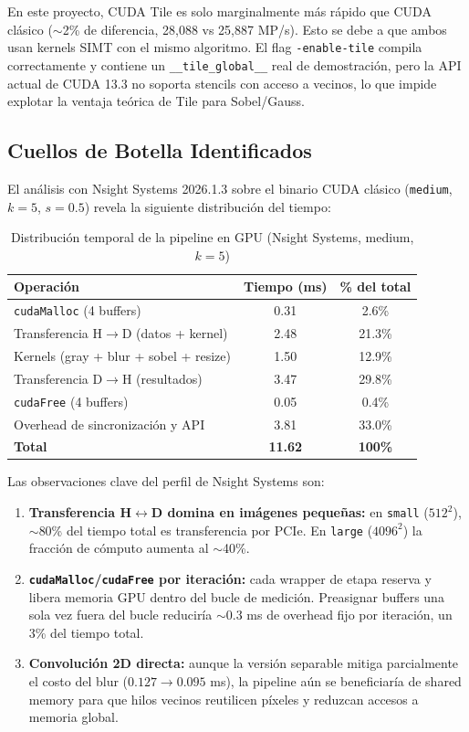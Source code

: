 \documentclass[12pt,a4paper]{article}
\begin{document}
En este proyecto, CUDA Tile es solo marginalmente m\'as r\'apido que CUDA cl\'asico ($\sim$2\% de diferencia, 28,088 vs 25,887 MP/s). Esto se debe a que ambos usan kernels SIMT con el mismo algoritmo. El flag \texttt{-enable-tile} compila correctamente y contiene un \texttt{\_\_tile\_global\_\_} real de demostraci\'on, pero la API actual de CUDA 13.3 no soporta stencils con acceso a vecinos, lo que impide explotar la ventaja te\'orica de Tile para Sobel/Gauss.

\subsection{Cuellos de Botella Identificados}

El an\'alisis con Nsight Systems 2026.1.3 sobre el binario CUDA cl\'asico (\texttt{medium}, $k=5$, $s=0.5$) revela la siguiente distribuci\'on del tiempo:

\begin{table}[H]
\centering
\caption{Distribuci\'on temporal de la pipeline en GPU (Nsight Systems, medium, $k=5$)}
\begin{tabular}{lcc}
\toprule
\textbf{Operaci\'on} & \textbf{Tiempo (ms)} & \textbf{\% del total} \\
\midrule
\texttt{cudaMalloc} (4 buffers) & 0.31 & 2.6\% \\
Transferencia H$\rightarrow$D (datos + kernel) & 2.48 & 21.3\% \\
Kernels (gray + blur + sobel + resize) & 1.50 & 12.9\% \\
Transferencia D$\rightarrow$H (resultados) & 3.47 & 29.8\% \\
\texttt{cudaFree} (4 buffers) & 0.05 & 0.4\% \\
Overhead de sincronizaci\'on y API & 3.81 & 33.0\% \\
\midrule
\textbf{Total} & \textbf{11.62} & \textbf{100\%} \\
\bottomrule
\end{tabular}
\end{table}

Las observaciones clave del perfil de Nsight Systems son:

\begin{enumerate}
  \item \textbf{Transferencia H$\leftrightarrow$D domina en im\'agenes peque\~nas:} en \texttt{small} ($512^2$), $\sim$80\% del tiempo total es transferencia por PCIe. En \texttt{large} ($4096^2$) la fracci\'on de c\'omputo aumenta al $\sim$40\%.
  \item \textbf{\texttt{cudaMalloc}/\texttt{cudaFree} por iteraci\'on:} cada wrapper de etapa reserva y libera memoria GPU dentro del bucle de medici\'on. Preasignar buffers una sola vez fuera del bucle reducir\'ia $\sim$0.3 ms de overhead fijo por iteraci\'on, un 3\% del tiempo total.
  \item \textbf{Convoluci\'on 2D directa:} aunque la versi\'on separable mitiga parcialmente el costo del blur ($0.127 \rightarrow 0.095$ ms), la pipeline a\'un se beneficiar\'ia de shared memory para que hilos vecinos reutilicen p\'ixeles y reduzcan accesos a memoria global.
\end{enumerate}
\end{document}

